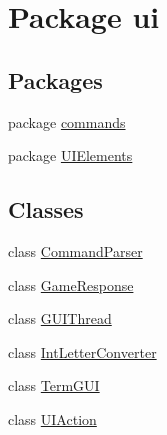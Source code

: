 \hypertarget{namespaceui}{}\section{Package ui}
\label{namespaceui}
\subsection*{Packages}
\begin{DoxyCompactItemize}
\item 
package \mbox{\hyperlink{namespaceui_1_1commands}{commands}}
\item 
package \mbox{\hyperlink{namespaceui_1_1_u_i_elements}{U\+I\+Elements}}
\end{DoxyCompactItemize}
\subsection*{Classes}
\begin{DoxyCompactItemize}
\item 
class \mbox{\hyperlink{classui_1_1_command_parser}{Command\+Parser}}
\item 
class \mbox{\hyperlink{classui_1_1_game_response}{Game\+Response}}
\item 
class \mbox{\hyperlink{classui_1_1_g_u_i_thread}{G\+U\+I\+Thread}}
\item 
class \mbox{\hyperlink{classui_1_1_int_letter_converter}{Int\+Letter\+Converter}}
\item 
class \mbox{\hyperlink{classui_1_1_term_g_u_i}{Term\+G\+UI}}
\item 
class \mbox{\hyperlink{classui_1_1_u_i_action}{U\+I\+Action}}
\end{DoxyCompactItemize}
